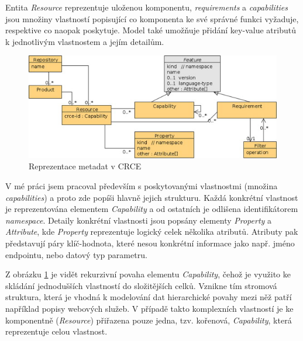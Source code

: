 \documentclass[czech,DP]{thesiskiv}
\begin{document}
Entita \textit{Resource} reprezentuje uloženou komponentu, \textit{requirements} a \textit{capabilities} jsou množiny vlastností popisující co komponenta ke své správné funkci vyžaduje, respektive co naopak poskytuje. Model také umožňuje přidání key-value atributů k jednotlivým vlastnostem a jejím detailům.
 
 \begin{figure}[h]
 	\centering
 	\includegraphics{resource-uml}
 	\caption{Reprezentace metadat v CRCE}
 	\label{fig:crce-resource-uml}
 \end{figure}

V mé práci jsem pracoval především s poskytovanými vlastnostmi (množina \textit{capabilities}) a proto zde popíši hlavně jejich strukturu. Každá konkrétní vlastnost je reprezentována elementem \textit{Capability} a od ostatních je odlišena identifikátorem \textit{namespace}. Detaily konkrétní vlastnosti jsou popsány elementy \textit{Property} a \textit{Attribute}, kde \textit{Property} reprezentuje logický celek několika atributů. Atributy pak představují páry klíč-hodnota, které nesou konkrétní informace jako např. jméno endpointu, nebo datový typ parametru.

Z obrázku \ref{fig:crce-resource-uml} je vidět rekurzivní povaha elementu \textit{Capability}, čehož je využito ke skládání jednodušších vlastností do složitějších celků. Vznikne tím stromová struktura, která je vhodná k modelování dat hierarchické povahy mezi něž patří například popisy webových služeb. V případě takto komplexních vlastností je ke komponentně (\textit{Resource}) přiřazena pouze jedna, tzv. kořenová, \textit{Capability}, která reprezentuje celou vlastnost.

\end{document}
